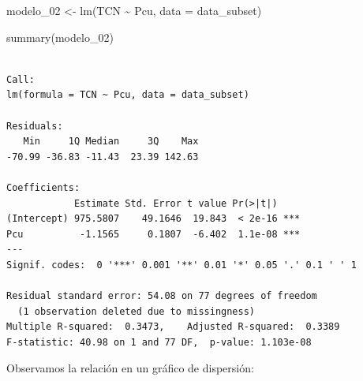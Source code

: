 \documentclass[
  letterpaper,
  DIV=11,
  numbers=noendperiod]{scrartcl}
\newenvironment{Shaded}{\begin{snugshade}}{\end{snugshade}}
\newcommand{\AttributeTok}[1]{\textcolor[rgb]{0.40,0.45,0.13}{#1}}
\newcommand{\DecValTok}[1]{\textcolor[rgb]{0.68,0.00,0.00}{#1}}
\newcommand{\FloatTok}[1]{\textcolor[rgb]{0.68,0.00,0.00}{#1}}
\newcommand{\FunctionTok}[1]{\textcolor[rgb]{0.28,0.35,0.67}{#1}}
\newcommand{\NormalTok}[1]{\textcolor[rgb]{0.00,0.23,0.31}{#1}}
\newcommand{\OtherTok}[1]{\textcolor[rgb]{0.00,0.23,0.31}{#1}}
\newcommand{\SpecialCharTok}[1]{\textcolor[rgb]{0.37,0.37,0.37}{#1}}
\newcommand{\StringTok}[1]{\textcolor[rgb]{0.13,0.47,0.30}{#1}}
\begin{document}
\begin{Shaded}
\begin{Highlighting}[]
\NormalTok{modelo\_02 }\OtherTok{\textless{}{-}} \FunctionTok{lm}\NormalTok{(TCN }\SpecialCharTok{\textasciitilde{}}\NormalTok{ Pcu, }\AttributeTok{data =}\NormalTok{ data\_subset)}

\FunctionTok{summary}\NormalTok{(modelo\_02)}
\end{Highlighting}
\end{Shaded}

\begin{verbatim}

Call:
lm(formula = TCN ~ Pcu, data = data_subset)

Residuals:
   Min     1Q Median     3Q    Max 
-70.99 -36.83 -11.43  23.39 142.63 

Coefficients:
            Estimate Std. Error t value Pr(>|t|)    
(Intercept) 975.5807    49.1646  19.843  < 2e-16 ***
Pcu          -1.1565     0.1807  -6.402  1.1e-08 ***
---
Signif. codes:  0 '***' 0.001 '**' 0.01 '*' 0.05 '.' 0.1 ' ' 1

Residual standard error: 54.08 on 77 degrees of freedom
  (1 observation deleted due to missingness)
Multiple R-squared:  0.3473,    Adjusted R-squared:  0.3389 
F-statistic: 40.98 on 1 and 77 DF,  p-value: 1.103e-08
\end{verbatim}

Observamos la relación en un gráfico de dispersión:

\begin{Shaded}
\end{Shaded}
\end{document}
